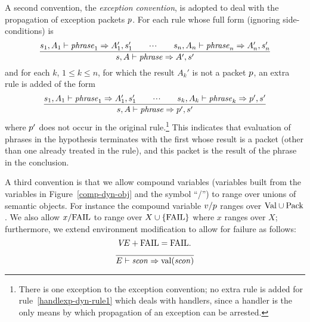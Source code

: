 A second convention, the {\sl exception convention}, is adopted to deal
with the propagation of exception packets $p$.
For each rule whose full form (ignoring side-conditions) is
\[ \frac{ s_1,A_1\vdash{\it phrase}_1\Rightarrow A_1',s_1'\qquad\mbox{$\cdot\!\cdot\!\cdot$}\qquad
          s_n,A_n\vdash{\it phrase}_n\Rightarrow A_n',s_n' }
        { s,A\vdash{\it phrase}\Rightarrow A',s'} \]
and for each $k$, $1\leq k\leq n$, for which the result $A_k'$ is not a
packet $p$, an extra rule is added of the form
\[ \frac{ s_1,A_1\vdash{\it phrase}_1\Rightarrow A_1',s_1'\qquad\mbox{$\cdot\!\cdot\!\cdot$}\qquad
          s_k,A_k\vdash{\it phrase}_k\Rightarrow p',s' }
        { s,A\vdash{\it phrase}\Rightarrow p',s'} \]
where $p'$ does not occur in the original rule.\footnote{There is one
exception to the exception convention; no extra rule is added for
rule~\ref{handlexp-dyn-rule1} which deals with handlers, 
since a handler is the only
means by which propagation of an exception can be arrested.}
This indicates that evaluation of phrases in the hypothesis terminates with the
first whose result is a packet (other than one already treated in the rule),
and this packet is the result of the phrase in the conclusion.

A third convention is that we allow compound variables (variables built
from the variables in Figure~\ref{comp-dyn-obj} and the symbol ``/'')
to range over unions of semantic objects. For instance 
the compound variable $v/p$ ranges
over ${\rm Val}\cup{\rm Pack}$. 
We also allow $x/{\rm FAIL}$ to range over $X\cup\{{\rm FAIL}\}$ where $x$ 
ranges over $X$;
furthermore, we extend environment modification to allow for failure
as follows:
\[\mbox{$V\!E$}+{\rm FAIL}={\rm FAIL}.\]
%
%
\begin{equation}	%
\frac{}
     {\E\ts\scon\ra\sconval(\scon)}\index{51.15}
\end{equation}




